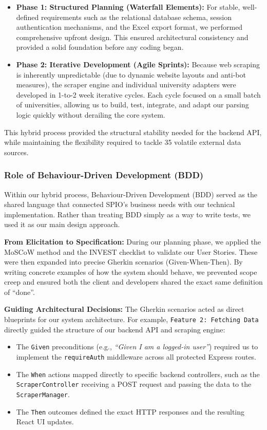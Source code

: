 \begin{itemize}
    \item \textbf{Phase 1: Structured Planning (Waterfall Elements):} For stable, well-defined requirements such as the relational database schema, session authentication mechanisms, and the Excel export format, we performed comprehensive upfront design. This ensured architectural consistency and provided a solid foundation before any coding began.
    \item \textbf{Phase 2: Iterative Development (Agile Sprints):} Because web scraping is inherently unpredictable (due to dynamic website layouts and anti-bot measures), the scraper engine and individual university adapters were developed in 1-to-2 week iterative cycles. Each cycle focused on a small batch of universities, allowing us to build, test, integrate, and adapt our parsing logic quickly without derailing the core system.
\end{itemize}
This hybrid process provided the structural stability needed for the backend API, while maintaining the flexibility required to tackle 35 volatile external data sources.

\subsubsection{Role of Behaviour-Driven Development (BDD)}
Within our hybrid process, Behaviour-Driven Development (BDD) served as the shared language that connected SPIO's business needs with our technical implementation. Rather than treating BDD simply as a way to write tests, we used it as our main design approach.

\textbf{From Elicitation to Specification:} 
During our planning phase, we applied the MoSCoW method and the INVEST checklist to validate our User Stories. These were then expanded into precise Gherkin scenarios (Given-When-Then). By writing concrete examples of how the system should behave, we prevented scope creep and ensured both the client and developers shared the exact same definition of ``done''.

\textbf{Guiding Architectural Decisions:} 
The Gherkin scenarios acted as direct blueprints for our system architecture. For example, \texttt{Feature 2: Fetching Data} directly guided the structure of our backend API and scraping engine:
\begin{itemize}
    \item The \texttt{Given} preconditions (e.g., \textit{``Given I am a logged-in user''}) required us to implement the \texttt{requireAuth} middleware across all protected Express routes.
    \item The \texttt{When} actions mapped directly to specific backend controllers, such as the \texttt{ScraperController} receiving a POST request and passing the data to the \texttt{ScraperManager}.
    \item The \texttt{Then} outcomes defined the exact HTTP responses and the resulting React UI updates.
\end{itemize}

